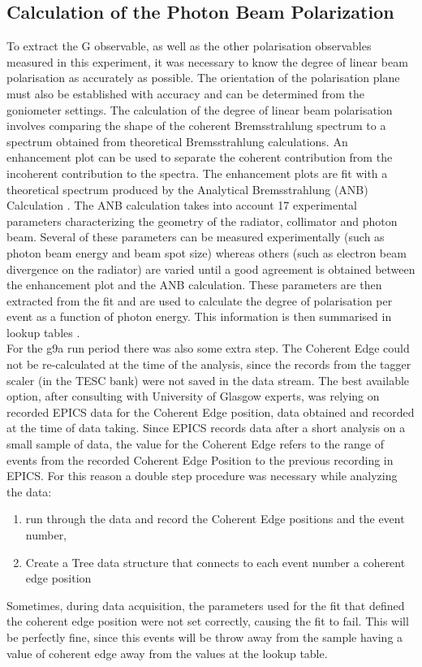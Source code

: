 \subsection{Calculation of the Photon Beam Polarization}
To extract the G observable, as well as the other polarisation observables measured in this experiment, it was necessary to know the degree of linear beam polarisation as accurately as possible. The orientation of the polarisation plane must also be established with accuracy and can be determined from the goniometer settings. The calculation of the degree of linear beam polarisation involves comparing the shape of the coherent Bremsstrahlung spectrum to a spectrum obtained from theoretical Bremsstrahlung calculations. An enhancement plot can be used to separate the coherent contribution from the incoherent contribution to the spectra. The enhancement plots are fit with a theoretical spectrum produced by the Analytical Bremsstrahlung (ANB) Calculation \cite{Natter_2003}\cite{Sabin_2010}. The ANB calculation takes into account 17 experimental parameters characterizing the geometry of the radiator, collimator and photon beam. Several of these parameters can be measured experimentally (such as photon beam energy and beam spot size) whereas others (such as electron beam divergence on the radiator) are varied until a good agreement is obtained between the enhancement plot and the ANB calculation. These parameters are then extracted from the fit and are used to calculate the degree of polarisation per event as a function of photon energy. This information is then summarised in lookup tables \cite{Anderson_table}. \\ For the g9a run period there was also some extra step. The Coherent Edge could not be re-calculated at the time of the analysis, since the records from the tagger scaler (in the TESC bank) were not saved in the data stream. The best available option, after consulting with University of Glasgow experts, was relying on recorded EPICS data for the Coherent Edge position, data obtained and recorded at the time of data taking. Since EPICS records data after a short analysis on a small sample of data, the value for the Coherent Edge refers to the range of events from the recorded Coherent Edge Position to the previous recording in EPICS. For this reason  a double step procedure was necessary while analyzing the data:
\begin{enumerate}
\item run through the data and record the Coherent Edge positions and the event number,
\item Create a Tree data structure that connects to each event number a coherent edge position 
\end{enumerate}
Sometimes, during data acquisition, the parameters used for the fit that defined the coherent edge position were not set correctly, causing the fit to fail. This will be perfectly fine, since this events will be throw away from the sample having a value of coherent edge away from the values at the lookup table.


